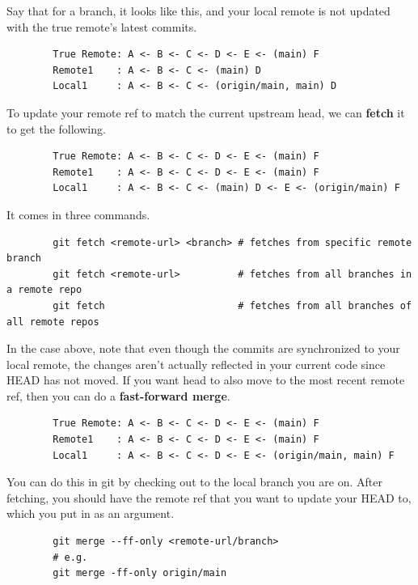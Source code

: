 \documentclass{article}
\begin{document}
    \begin{definition}[Fetch] 
      Say that for a branch, it looks like this, and your local remote is not updated with the true remote's latest commits. 
      \begin{lstlisting}
        True Remote: A <- B <- C <- D <- E <- (main) F
        Remote1    : A <- B <- C <- (main) D 
        Local1     : A <- B <- C <- (origin/main, main) D
      \end{lstlisting}
      To update your remote ref to match the current upstream head, we can \textbf{fetch} it to get the following. 
      \begin{lstlisting}
        True Remote: A <- B <- C <- D <- E <- (main) F
        Remote1    : A <- B <- C <- D <- E <- (main) F
        Local1     : A <- B <- C <- (main) D <- E <- (origin/main) F
      \end{lstlisting}
      It comes in three commands. 
      \begin{lstlisting}
        git fetch <remote-url> <branch> # fetches from specific remote branch 
        git fetch <remote-url>          # fetches from all branches in a remote repo  
        git fetch                       # fetches from all branches of all remote repos
      \end{lstlisting}
    \end{definition}

    \begin{definition}
      In the case above, note that even though the commits are synchronized to your local remote, the changes aren't actually reflected in your current code since HEAD has not moved. If you want head to also move to the most recent remote ref, then you can do a \textbf{fast-forward merge}. 
      \begin{lstlisting}
        True Remote: A <- B <- C <- D <- E <- (main) F
        Remote1    : A <- B <- C <- D <- E <- (main) F
        Local1     : A <- B <- C <- D <- E <- (origin/main, main) F
      \end{lstlisting}
      You can do this in git by checking out to the local branch you are on. After fetching, you should have the remote ref that you want to update your HEAD to, which you put in as an argument. 
      \begin{lstlisting}
        git merge --ff-only <remote-url/branch> 
        # e.g. 
        git merge -ff-only origin/main 
      \end{lstlisting}
    \end{definition}
\end{document}
